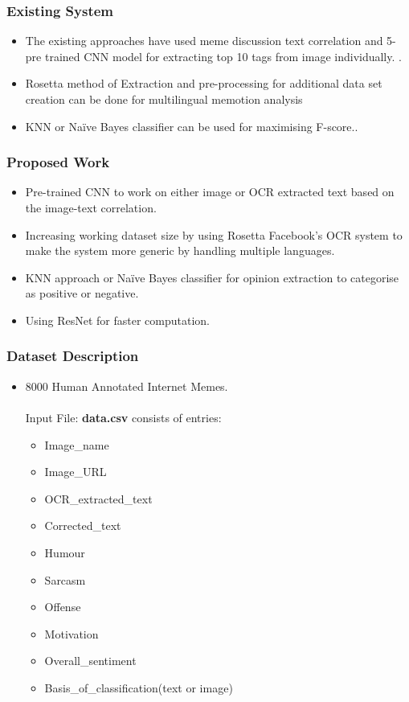 \documentclass[]{beamer}
\begin{document}
\begin{frame}\frametitle{Existing System}
 \begin{itemize}
 	\item The existing approaches have used meme discussion text correlation and 5-pre trained CNN model for extracting top 10 tags from image individually. \cite{imageSentimentPred}\cite{imageTextConsistency}.
 	\item Rosetta method of Extraction and pre-processing for additional data set creation can be done for multilingual memotion analysis\cite{rosettaDataset}
 	\item KNN or Na\"ive Bayes classifier can be used for maximising F-score.\cite{memeOpinionOCR}\cite{memeticEnggTwitter}. 	
\end{itemize}
\end{frame}

\begin{frame}\frametitle{Proposed Work}
  
\begin{itemize}
\item Pre-trained CNN to work on either image or OCR extracted text based on the image-text correlation.
\item Increasing working dataset size by using Rosetta Facebook's OCR system to make the system more generic by handling multiple languages.
\item KNN approach or Na\"ive Bayes classifier for opinion extraction to categorise as positive or negative.
\item Using ResNet for faster computation.
\end{itemize}
\end{frame}

\begin{frame}\frametitle{Dataset Description}
 \begin{itemize}
 \item 8000 Human Annotated Internet Memes.\\~\\
	
	Input File: \textbf{data.csv} consists of entries: 
	\begin{itemize}
\item Image\_name
\item Image\_URL
\item OCR\_extracted\_text
\item Corrected\_text
\item Humour
\item Sarcasm
\item Offense
\item Motivation
\item Overall\_sentiment
\item Basis\_of\_classification(text or image)   
	\end{itemize}
\end{itemize}
\end{frame}
\end{document}
